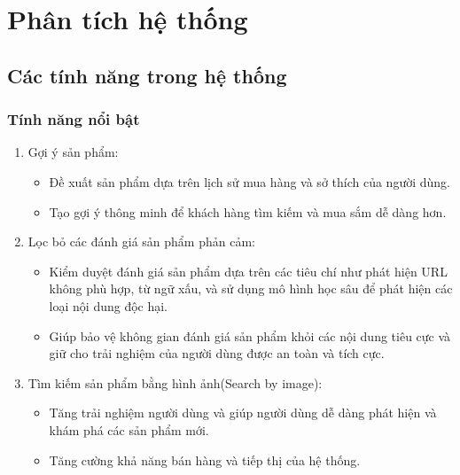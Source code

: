 \section{Phân tích hệ thống}
\subsection{Các tính năng trong hệ thống}
\subsubsection{Tính năng nổi bật}
\begin{enumerate}
    \item Gợi ý sản phẩm:
    \begin{itemize}
        \item Đề xuất sản phẩm dựa trên lịch sử mua hàng và sở thích của người dùng.
        \item Tạo gợi ý thông minh để khách hàng tìm kiếm và mua sắm dễ dàng hơn.
    \end{itemize}

\item Lọc bỏ các đánh giá sản phẩm phản cảm:
\begin{itemize}
    \item Kiểm duyệt đánh giá sản phẩm dựa trên các tiêu chí như phát hiện URL không phù hợp, từ ngữ xấu, và sử dụng mô hình học sâu để phát hiện các loại nội dung độc hại. 
    \item Giúp bảo vệ không gian đánh giá sản phẩm khỏi các nội dung tiêu cực và giữ cho trải nghiệm của người dùng được an toàn và tích cực.
\end{itemize}
   
    \item Tìm kiếm sản phẩm bằng hình ảnh(Search by image):
    \begin{itemize}
        \item Tăng trải nghiệm người dùng và giúp người dùng dễ dàng phát hiện và khám phá các sản phẩm mới.
        \item Tăng cường khả năng bán hàng và tiếp thị của hệ thống.
    \end{itemize}
\end{enumerate}
